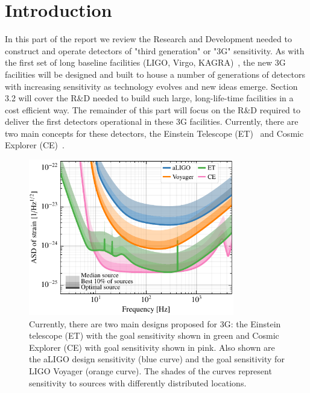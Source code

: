 \chapter{Introduction}
\label{sec:Intro}

In this part of the report we review the Research and Development needed to construct and operate detectors of "third generation" or "3G" sensitivity. As with the first set of long baseline facilities (LIGO, Virgo, KAGRA)~\cite{AdvancedVirgo2015,AdvancedLIGO2015,KAGRA2013}, the new 3G facilities will be designed and built to house a number of generations of detectors with increasing sensitivity as technology evolves and new ideas emerge. Section 3.2 will cover the R\&D needed to build such large, long-life-time facilities in a cost efficient way. The remainder of this part will focus on the R\&D required to deliver the first detectors operational in these 3G facilities. Currently, there are two main concepts for these detectors, the Einstein Telescope (ET)~\cite{ET2011} and Cosmic Explorer (CE)~\cite{CosmicExplorer2017}.

\begin{figure}[ht]
\centering
\includegraphics*[width= 0.8\textwidth]{Figures/noises_percentiles.pdf}
\caption{Currently, there are two main designs proposed for 3G: the Einstein telescope (ET) \cite{ET2011} with the goal sensitivity shown in green and Cosmic Explorer (CE) \cite{CosmicExplorer2017} with goal sensitivity shown in pink.  Also shown are the aLIGO design sensitivity (blue curve) and the goal sensitivity for LIGO Voyager (orange curve). The shades of the curves represent sensitivity to sources with differently distributed locations.}
\label{fig:3GSens}
\end{figure}

